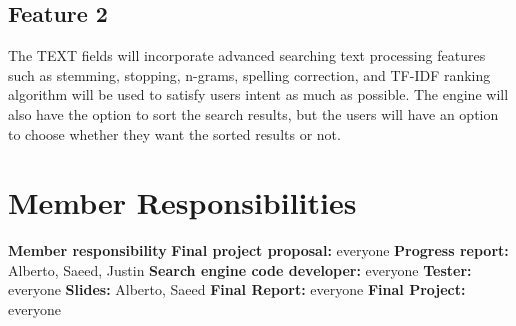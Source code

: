 \documentclass[11pt]{article}
\begin{document}
\subsection{Feature 2}
The TEXT fields will incorporate advanced searching text processing features such as stemming, stopping, n-grams, spelling correction, and TF-IDF ranking algorithm will be used to satisfy users intent as much as possible. The engine will also have the option to sort the search results, but the users will have an option to choose whether they want the sorted results or not.

\section{Member Responsibilities}
\textbf{Member responsibility} \newline
\textbf{Final project proposal:} everyone \newline
\textbf{Progress report:} Alberto, Saeed, Justin \newline
\textbf{Search engine code developer:} everyone \newline
\textbf{Tester:} everyone \newline
\textbf{Slides:} Alberto, Saeed \newline
\textbf{Final Report:} everyone \newline
\textbf{Final Project:} everyone


%
%
\end{document}
